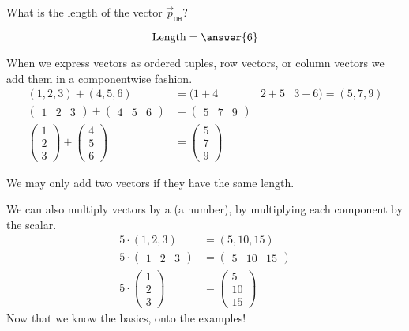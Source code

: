\documentclass{ximera}
\begin{document}
\begin{question}
  What is the length of the vector $\vec{p}_{\texttt{OH}}$?
  \begin{prompt}
  \[
  \text{Length} = \answer{6}
  \]
  \end{prompt}
\end{question}
When we express vectors as ordered tuples, row vectors, or column
vectors we add them in a componentwise fashion.
\begin{align*}
  (1,2,3) + (4,5,6) &= (1+4 & 2+5 & 3+6)  = (5,7,9)\\
  \begin{pmatrix} 1 & 2 & 3   \end{pmatrix} + \begin{pmatrix} 4 & 5 & 6   \end{pmatrix}&= \begin{pmatrix} 5 & 7 & 9   \end{pmatrix}\\
  \begin{pmatrix} 1\\ 2\\ 3   \end{pmatrix} + \begin{pmatrix} 4\\ 5\\ 6   \end{pmatrix} &= \begin{pmatrix} 5\\ 7\\ 9   \end{pmatrix}
\end{align*}
\begin{warning}
  We may only add two vectors if they have the same length.
\end{warning}




We can also multiply vectors by a  (a number), by
multiplying each component by the scalar.
\begin{align*}
  5\cdot   (1,2,3) &= (5,10,15)\\
  5\cdot \begin{pmatrix} 1 & 2 & 3   \end{pmatrix}  &= \begin{pmatrix} 5 & 10 & 15   \end{pmatrix}\\
  5\cdot  \begin{pmatrix} 1\\ 2\\ 3   \end{pmatrix} &= \begin{pmatrix} 5\\ 10\\ 15   \end{pmatrix}
\end{align*}
Now that we know the basics, onto the examples!
\end{document}
